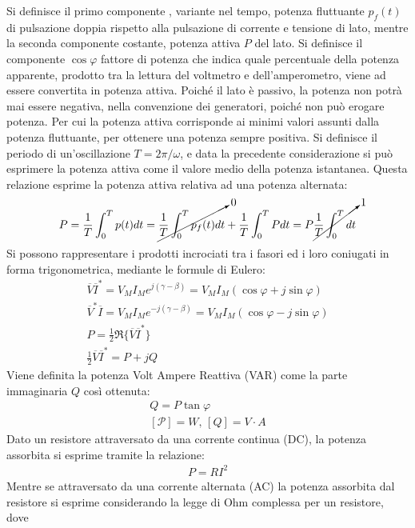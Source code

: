 \documentclass{article}
\numberwithin{equation}{subsection}
\begin{document}
Si definisce il primo componente , variante nel tempo, potenza fluttuante $p_f(t)$ di pulsazione doppia rispetto alla pulsazione di corrente e tensione di lato, mentre la seconda 
componente costante, potenza attiva $P$ del lato. Si definisce il componente $\cos\varphi$ fattore di potenza che indica quale percentuale della potenza apparente, prodotto 
tra la lettura del voltmetro e dell'amperometro, viene ad essere convertita in potenza attiva. 
Poiché il lato è passivo, la potenza non potrà mai essere negativa, nella convenzione dei generatori, poiché non può erogare potenza. Per cui la potenza attiva corrisponde 
ai minimi valori assunti dalla potenza fluttuante, per ottenere una potenza sempre positiva. 
Si definisce il periodo di un'oscillazione $T=2\pi/\omega$, e data la precedente considerazione si può esprimere la potenza attiva come il valore medio della potenza 
istantanea. Questa relazione esprime la potenza attiva relativa ad una potenza alternata:
\begin{gather*}
    P=\displaystyle\frac{1}{T}\int_0^Tp(t)dt=\cancelto{0}{\frac{1}{T}\int_0^Tp_f(t)dt}+\frac{1}{T}\int_0^TPdt=P\cancelto{1}{\frac{1}{T}\int_0^Tdt}
\end{gather*}
Si possono rappresentare i prodotti incrociati tra i fasori ed i loro coniugati in forma trigonometrica, mediante le formule di Eulero: 
\begin{gather*}
    \overline{V}\overline{I}^*=V_MI_Me^{j(\gamma-\beta)}=V_MI_M\left(\cos\varphi+j\sin\varphi\right)\\
    \overline{V}^*\overline{I}=V_MI_Me^{-j(\gamma-\beta)}=V_MI_M\left(\cos\varphi-j\sin\varphi\right)\\
    P=\displaystyle\frac{1}{2}\Re\{\overline{V}\overline{I}^*\}\\
    \displaystyle\frac{1}{2}\overline{V}\overline{I}^*=P+jQ
\end{gather*}
Viene definita la potenza Volt Ampere Reattiva (VAR) come la parte immaginaria $Q$ così ottenuta: 
\begin{gather*}
    Q=P\tan\varphi\\
    [\mathcal{P}]=W,\,[Q]=V\cdot A
\end{gather*}
Dato un resistore attraversato da una corrente continua (DC), la potenza assorbita si esprime tramite la relazione:
\begin{gather*}
    P=RI^2
\end{gather*}
Mentre se attraversato da una corrente alternata (AC) la potenza assorbita dal resistore si esprime considerando la legge di Ohm complessa per un resistore, dove 
\end{document}
